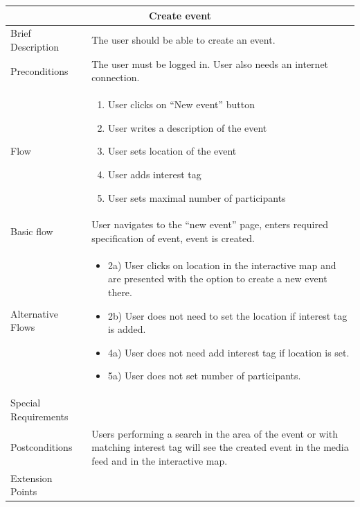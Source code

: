 \begin{minipage}{\linewidth}
\begin{tabular}{|l|p{85mm}|}
  \hline
  \multicolumn{2}{|c|}{\cellcolor{gray!25} \textbf{Create event}} \\
  \hline
  Brief Description & The user should be able to create an event.\\
  Preconditions & The user must be logged in. User also needs an internet connection.\\
  Flow &
    \begin{enumerate}
      \item User clicks on “New event” button
      \item User writes a description of the event
      \item User sets location of the event
      \item User adds interest tag
      \item User sets maximal number of participants
    \end{enumerate} \\
  Basic flow & User navigates to the “new event” page, enters required specification of event, event is created.\\
  Alternative Flows & 
    \begin{itemize}
      \item 2a) User clicks on location in the interactive map and are presented with the option to create a new event there.
      \item 2b) User does not need to set the location if interest tag is added.
      \item 4a) User does not need add interest tag if location is set.
      \item 5a) User does not set number of participants.
    \end{itemize} \\
  Special Requirements & \\
  Postconditions & Users performing a search in the area of the event or with matching interest tag will see the created event in the media feed and in the interactive map.\\
  Extension Points & \\
  \hline
\end{tabular}
\end{minipage}

